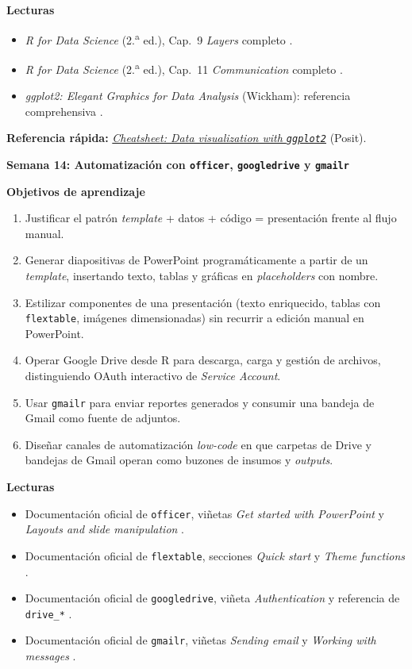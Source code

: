 \documentclass[11pt,letterpaper]{article}
\newcommand{\semana}[2]{%
  \bigskip%
  {\color{main}\Large\bfseries Semana #1: #2\par}%
  \smallskip%
}
\newcommand{\cheatsheet}[2]{%
  \href{https://rstudio.github.io/cheatsheets/#1.pdf}{\textit{Cheatsheet: #2}}%
}
\begin{document}
\medskip
\noindent\textbf{Lecturas}
\begin{itemize}[leftmargin=*, itemsep=1pt]
    \item \textit{R for Data Science} (2.\textsuperscript{a} ed.), Cap.\ 9 \textit{Layers} completo \cite{wickham2023r4ds}.
    \item \textit{R for Data Science} (2.\textsuperscript{a} ed.), Cap.\ 11 \textit{Communication} completo \cite{wickham2023r4ds}.
    \item \textit{ggplot2: Elegant Graphics for Data Analysis} (Wickham): referencia comprehensiva \cite{wickham2016ggplot2}.
\end{itemize}

\medskip
\noindent\textbf{Referencia rápida:} \cheatsheet{data-visualization}{Data visualization with \texttt{ggplot2}} (Posit).

\semana{14}{Automatización con \texttt{officer}, \texttt{googledrive} y \texttt{gmailr}}

\medskip
\noindent\textbf{Objetivos de aprendizaje}
\begin{enumerate}[leftmargin=*, itemsep=1pt]
    \item Justificar el patrón \textit{template} + datos + código = presentación frente al flujo manual.
    \item Generar diapositivas de PowerPoint programáticamente a partir de un \textit{template}, insertando texto, tablas y gráficas en \textit{placeholders} con nombre.
    \item Estilizar componentes de una presentación (texto enriquecido, tablas con \texttt{flextable}, imágenes dimensionadas) sin recurrir a edición manual en PowerPoint.
    \item Operar Google Drive desde R para descarga, carga y gestión de archivos, distinguiendo OAuth interactivo de \textit{Service Account}.
    \item Usar \texttt{gmailr} para enviar reportes generados y consumir una bandeja de Gmail como fuente de adjuntos.
    \item Diseñar canales de automatización \textit{low-code} en que carpetas de Drive y bandejas de Gmail operan como buzones de insumos y \textit{outputs}.
\end{enumerate}

\medskip
\noindent\textbf{Lecturas}
\begin{itemize}[leftmargin=*, itemsep=1pt]
    \item Documentación oficial de \texttt{officer}, viñetas \textit{Get started with PowerPoint} y \textit{Layouts and slide manipulation} \cite{gohel-officer}.
    \item Documentación oficial de \texttt{flextable}, secciones \textit{Quick start} y \textit{Theme functions} \cite{gohel-flextable}.
    \item Documentación oficial de \texttt{googledrive}, viñeta \textit{Authentication} y referencia de \texttt{drive\_*} \cite{bryan-googledrive}.
    \item Documentación oficial de \texttt{gmailr}, viñetas \textit{Sending email} y \textit{Working with messages} \cite{hester-gmailr}.
\end{itemize}
\end{document}
